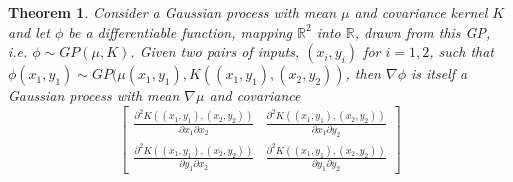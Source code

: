 \documentclass[11pt,a4paper]{article}
\newtheorem{theorem}{Theorem}
\begin{document}
\begin{theorem}
Consider a Gaussian process with mean $\mu$ and covariance kernel $K$ and let $\phi$ be a differentiable function, mapping $\mathbb{R}^2$ into $\mathbb{R}$, drawn from this GP, i.e. $\phi \sim \textit{GP}(\mu, K)$. Given two pairs of inputs, $(x_i,y_i)$ for $i=1,2$, such that $\phi(x_1,y_1) \sim \textit{GP}(\mu(x_1,y_1), K((x_1,y_1), (x_2,y_2))$, then $\nabla \phi$ is itself a Gaussian process with mean $\nabla \mu$ and covariance
$$
\begin{bmatrix}
\frac{\partial^2 K((x_1,y_1), (x_2,y_2))}{\partial x_1 \partial x_2} & \frac{\partial^2 K((x_1,y_1), (x_2,y_2))}{\partial x_1 \partial y_2}\\
\frac{\partial^2 K((x_1,y_1), (x_2,y_2))}{\partial y_1 \partial x_2} & \frac{\partial^2 K((x_1,y_1), (x_2,y_2))}{\partial y_1 \partial y_2}
\end{bmatrix}
$$
\end{theorem}
\end{document}

